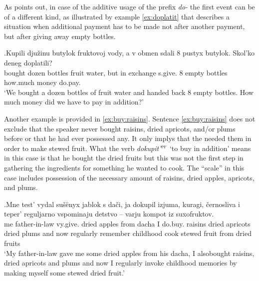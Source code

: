 As \citet[80]{Kagan:book} points out, in case of the additive usage of the prefix \textit{do-}   the first event can be of a different kind, as illustrated by example \ref{ex:doplatit} that describes a situation when additional payment has to be made not after another payment, but after giving away empty bottles.

\exg.\label{ex:doplatit}Kupili dju\v{z}inu butylok fruktovoj vody, a v obmen sdali 8 pustyx butylok. Skol'ko deneg doplatili?\\
bought dozen bottles fruit water, but in exchange s.give. 8 empty bottles how.much money do.pay.\\
\trans `We bought a dozen bottles of fruit water and handed back 8 empty bottles. How much money did we have to pay in addition?'


Another example is provided in \ref{ex:buy:raisins}. Sentence \ref{ex:buy:raisins} does not exclude that the speaker never bought raisins, dried apricots, and/or plums before or that he had ever possessed any. It only implys that the needed them in order to make stewed fruit. What the verb \textit{dokupit'}$^{\textsc{pf}}$ `to buy in addition' means in this case is that he bought the dried fruits but this was not the first step in gathering the ingredients for something he wanted to cook. The ``scale'' in this case includes possession of the necessary amount of raisins, dried apples, apricots, and plums. 

\exg.\label{ex:buy:raisins}Mne test' vydal su\v{s}\"{e}nyx jablok s da\v{c}i, ja dokupil izjuma, kuragi, \v{c}ernosliva i teper' reguljarno vspominaju detstvo -- varju kompot iz suxofruktov.\\
me father-in-law vy.give. dried apples from dacha I do.buy. raisins {dried apricots} {dried plums} and now regularly remember childhood {} cook {stewed fruit} from {dried fruits}\\
\trans `My father-in-law gave me some dried apples from his dacha, I also\linebreak bought raisins, dried apricots and plums and now I regularly invoke childhood memories by making myself some stewed dried fruit.'\\

